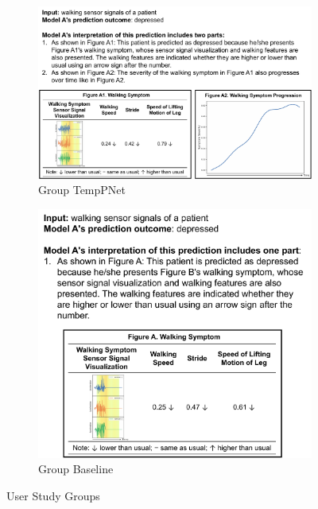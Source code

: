 \documentclass[mnsc]{informs3b} %
\begin{document}
\begin{figure}[H]
\centering
\begin{subfigure}{0.59\textwidth}
    \includegraphics[width=\textwidth]{imgs/user-study-temppnet.pdf}
    \caption{Group TempPNet}
    \label{fig:user-study-temppnet}
\end{subfigure}
\begin{subfigure}{0.4\textwidth}
    \includegraphics[width=\textwidth]{imgs/user-study-protopnet.pdf}
    \caption{Group Baseline}
    \label{fig:user-study-protopnet}
\end{subfigure}
\caption{User Study Groups}
\label{fig:user-study-groups}
\end{figure}
\end{document}
